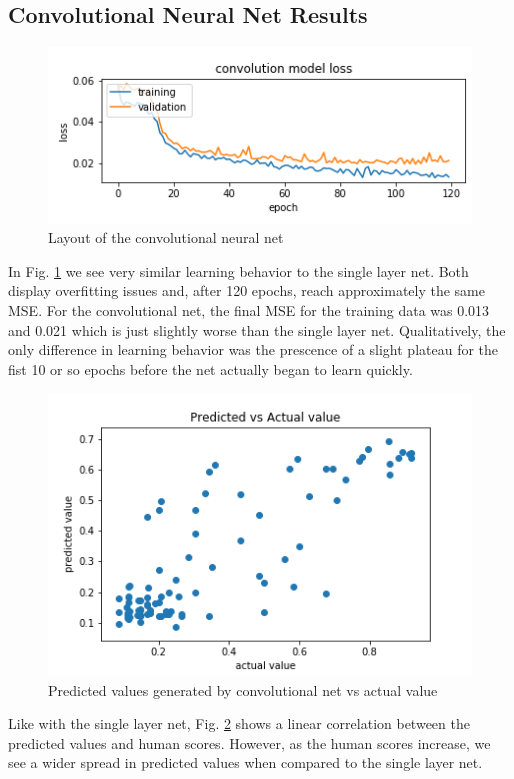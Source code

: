 \documentclass[conference]{IEEEtran}
\begin{document}
\subsection{Convolutional Neural Net Results}

\begin{figure}[htbp]
\centerline{\includegraphics[width=0.75\linewidth]{./Images/ConvModelLoss.png}}
\caption{Layout of the convolutional neural net}
\label{fig:ConvModelLoss}
\end{figure}

In Fig. \ref{fig:ConvModelLoss} we see very similar learning behavior to the single layer net. Both display overfitting issues and, after 120 epochs, reach approximately the same MSE. For the convolutional net, the final MSE for the training data was 0.013 and 0.021 which is just slightly worse than the single layer net. Qualitatively, the only difference in learning behavior was the prescence of a slight plateau for the fist 10 or so epochs before the net actually began to learn quickly.

\begin{figure}[htbp]
\centerline{\includegraphics[width=0.75\linewidth]{./Images/ConvPredictedVAct.png}}
\caption{Predicted values generated by convolutional net vs actual value}
\label{fig:ConvPredictedVAct}
\end{figure}

Like with the single layer net, Fig. \ref{fig:ConvPredictedVAct} shows a linear correlation between the predicted values and human scores. However, as the human scores increase, we see a wider spread in predicted values when compared to the single layer net. 
\end{document}
